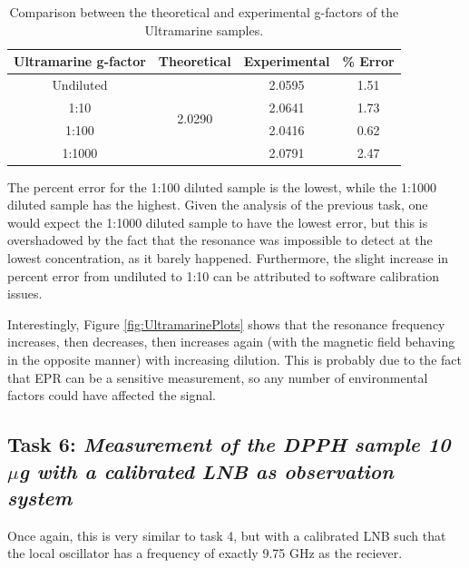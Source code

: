 \documentclass{article}
\begin{document}
\begin{table}[h]
	\centering
	\begin{tabular}{|c|c|c|c|}
	\hline
	Ultramarine g-factor & Theoretical             & Experimental & \% Error \\ \hline
	Undiluted            & \multirow{4}{*}{2.0290} & 2.0595       & 1.51     \\ \cline{1-1} \cline{3-4} 
	1:10                 &                         & 2.0641       & 1.73     \\ \cline{1-1} \cline{3-4} 
	1:100                &                         & 2.0416       & 0.62     \\ \cline{1-1} \cline{3-4} 
	1:1000               &                         & 2.0791       & 2.47     \\ \hline
	\end{tabular}
	\caption{Comparison between the theoretical and experimental g-factors of the Ultramarine samples.}
\end{table}

The percent error for the 1:100 diluted sample is the lowest, while the 1:1000 diluted sample has the highest. Given the analysis of the previous task, one would expect the 1:1000 diluted sample to have the lowest error, but this is overshadowed by the fact that
the resonance was impossible to detect at the lowest concentration, as it barely happened. Furthermore, the slight increase in percent error from undiluted to 1:10 can be attributed to software calibration issues. 

Interestingly, Figure \ref{fig:UltramarinePlots} shows that the resonance frequency increases, then decreases, then increases again (with the magnetic field behaving in the opposite manner) with increasing dilution. This is probably due to the fact that EPR can be a sensitive measurement, so any number of environmental factors could have affected the signal. 

\pagebreak{}

\subsection{Task 6: \textit{Measurement of the DPPH sample 10 $\mu$g with a calibrated LNB as observation
system}}

Once again, this is very similar to task 4, but with a calibrated LNB such that the local oscillator has a frequency of exactly 9.75 GHz as the reciever. 
\end{document}
